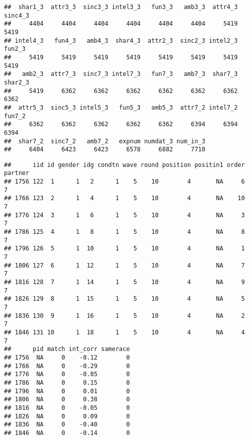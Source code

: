 \documentclass[]{article}
\newenvironment{Shaded}{\begin{snugshade}}{\end{snugshade}}
\newcommand{\KeywordTok}[1]{\textcolor[rgb]{0.13,0.29,0.53}{\textbf{#1}}}
\newcommand{\DecValTok}[1]{\textcolor[rgb]{0.00,0.00,0.81}{#1}}
\newcommand{\StringTok}[1]{\textcolor[rgb]{0.31,0.60,0.02}{#1}}
\newcommand{\CommentTok}[1]{\textcolor[rgb]{0.56,0.35,0.01}{\textit{#1}}}
\newcommand{\OperatorTok}[1]{\textcolor[rgb]{0.81,0.36,0.00}{\textbf{#1}}}
\newcommand{\NormalTok}[1]{#1}
\begin{document}
\begin{verbatim}
##  shar1_3  attr3_3  sinc3_3 intel3_3   fun3_3   amb3_3  attr4_3  sinc4_3 
##     4404     4404     4404     4404     4404     4404     5419     5419 
## intel4_3   fun4_3   amb4_3  shar4_3  attr2_3  sinc2_3 intel2_3   fun2_3 
##     5419     5419     5419     5419     5419     5419     5419     5419 
##   amb2_3  attr7_3  sinc7_3 intel7_3   fun7_3   amb7_3  shar7_3  shar2_3 
##     5419     6362     6362     6362     6362     6362     6362     6362 
##  attr5_3  sinc5_3 intel5_3   fun5_3   amb5_3  attr7_2 intel7_2   fun7_2 
##     6362     6362     6362     6362     6362     6394     6394     6394 
##  shar7_2  sinc7_2   amb7_2   expnum numdat_3 num_in_3 
##     6404     6423     6423     6578     6882     7710
\end{verbatim}

\begin{Shaded}
\end{Shaded}

\begin{verbatim}
##      iid id gender idg condtn wave round position positin1 order partner
## 1756 122  1      1   2      1    5    10        4       NA     6       7
## 1766 123  2      1   4      1    5    10        4       NA    10       7
## 1776 124  3      1   6      1    5    10        4       NA     3       7
## 1786 125  4      1   8      1    5    10        4       NA     8       7
## 1796 126  5      1  10      1    5    10        4       NA     1       7
## 1806 127  6      1  12      1    5    10        4       NA     7       7
## 1816 128  7      1  14      1    5    10        4       NA     9       7
## 1826 129  8      1  15      1    5    10        4       NA     5       7
## 1836 130  9      1  16      1    5    10        4       NA     2       7
## 1846 131 10      1  18      1    5    10        4       NA     4       7
##      pid match int_corr samerace
## 1756  NA     0    -0.12        0
## 1766  NA     0    -0.29        0
## 1776  NA     0    -0.05        0
## 1786  NA     0     0.15        0
## 1796  NA     0     0.01        0
## 1806  NA     0     0.38        0
## 1816  NA     0    -0.05        0
## 1826  NA     0     0.09        0
## 1836  NA     0    -0.40        0
## 1846  NA     0    -0.14        0
\end{verbatim}
\end{document}
